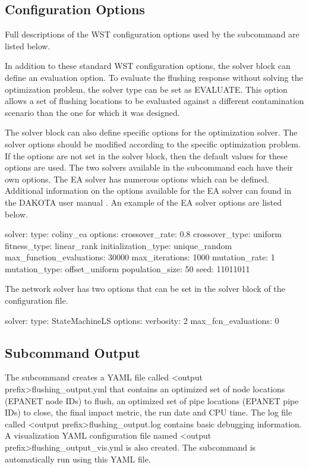 \subsection{Configuration Options}

Full descriptions of the WST configuration options used by the  subcommand are listed below.


In addition to these standard WST configuration options, the solver block can define 
an evaluation option. To evaluate the flushing response without solving the 
optimization problem, the solver type can be set as EVALUATE. This option allows a 
set of flushing locations to be evaluated against a different contamination 
scenario than the one for which it was designed. 

The solver block can also define specific options for the optimization solver. 
The solver options should be modified according to the specific optimization problem. 
If the options are not set in the solver block, then the default values for these options are used. 
The two solvers available in the  subcommand each have their own options. 
The EA solver has numerous options which can be defined. Additional information on the options available
for the EA solver can found in the DAKOTA user manual \citep{DakotaUserManual}. 
An example of the EA solver options are listed below.

\begin{unknownListing}
solver:
  type: coliny_ea
  options: 
    crossover_rate: 0.8
    crossover_type: uniform
    fitness_type: linear_rank
    initialization_type: unique_random
    max_function_evaluations: 30000
    max_iterations: 1000
    mutation_rate: 1
    mutation_type: offset_uniform
    population_size: 50
    seed: 11011011
\end{unknownListing}

The network solver has two options that can be set in the solver block of the configuration file. 
\begin{unknownListing}
solver:  
  type: StateMachineLS
  options:
    verbosity: 2
    max_fcn_evaluations: 0
\end{unknownListing}

\subsection{Subcommand Output}
The  subcommand creates a YAML file called <output prefix>flushing\_output.yml 
that contains an optimized set of node locations (EPANET node IDs) to flush, 
an optimized set of pipe locations (EPANET pipe IDs) to close,
the final impact metric, the run date and CPU time. 
The log file called <output prefix>flushing\_output.log contains basic debugging information.
A visualization YAML configuration file named <output prefix>flushing\_output\_vis.yml is also created.
The  subcommand is automatically run using this YAML file.

